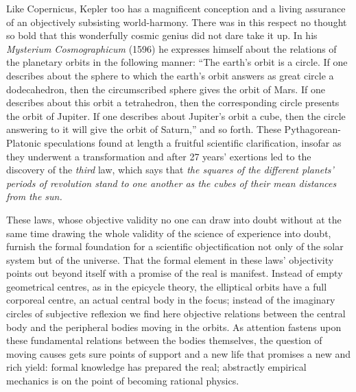 \documentclass[12pt,a4paper]{book}
\begin{document}
Like Copernicus, Kepler too has a magnificent conception and a living assurance of an objectively subsisting
world-harmony. There was in this respect no thought so bold that this wonderfully cosmic genius did not dare
take it up. In his
\textit{Mysterium Cosmographicum} (1596) he expresses himself about the relations of the planetary orbits in
the following manner: ``The earth's orbit is a circle. If one describes about the sphere to which the earth's
orbit answers as great circle a dodecahedron, then the circumscribed sphere gives the orbit of Mars. If one
describes about this orbit a tetrahedron, then the corresponding circle presents the orbit of Jupiter. If one
describes about Jupiter's orbit a cube, then the circle answering to it will give the orbit of Saturn,'' and
so forth. These Pythagorean-Platonic speculations found at length a fruitful scientific clarification,
insofar as they underwent a transformation and after 27 years' exertions led to the discovery of the
\emph{third} law, which says that \emph{the squares of the different planets' periods of revolution stand to
one another as the cubes of their mean distances from the sun.}

These laws, whose objective validity no one can draw into doubt without at the same time drawing the whole
validity of the science of experience into doubt, furnish the formal foundation for a scientific
objectification not only of the solar system but of the universe. That the formal element in these laws'
objectivity points out beyond itself with a promise of the real is manifest. Instead of empty geometrical
centres, as in the epicycle theory, the elliptical orbits have a full corporeal
centre, an actual central body in the focus; instead of the imaginary circles of subjective reflexion we find
here objective relations between the central body and the peripheral bodies moving in the orbits. As
attention fastens upon these fundamental relations between the bodies themselves, the question of moving
causes gets sure points of support and a new life that promises a new and rich yield: formal knowledge has
prepared the real; abstractly empirical mechanics is on the point of becoming rational physics.
\end{document}

